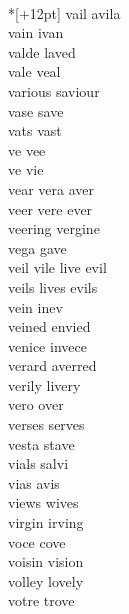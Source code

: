 \vspace{14pt}
\noindent\notextbf{\LargeV}\\*[+12pt]
vail avila \\
vain ivan\\
valde laved\\
vale veal\\
various saviour\\
vase save\\
vats vast\\
ve vee \\
ve vie \\
vear vera aver\\
veer vere ever\\
veering vergine\\
vega gave\\
veil vile live evil\\
veils lives evils\\
vein inev\\
veined envied\\
venice invece\\
verard averred \\
verily livery\\
vero over\\
verses serves\\
vesta stave\\
vials salvi\\
vias avis\\
views wives\\
virgin irving\\
voce cove\\
voisin vision\\
volley lovely\\
votre trove\\

